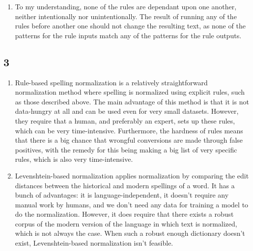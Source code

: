 \documentclass{article}
\begin{document}
\begin{enumerate}
\begin{enumerate}
        \item ``-ie'' is replaced by ``-y'' at the end of a word. This is seemingly a historical spelling in words such as ``Normandie'', which is nowadays spelled ``Normandy'', alongside varying other words.
    \end{enumerate}
    \item To my understanding, none of the rules are dependant upon one another, neither intentionally nor unintentionally. The result of running any of the rules before another one should not change the resulting text, as none of the patterns for the rule inputs match any of the patterns for the rule outputs.
\end{enumerate}

\subsection{3}
\begin{enumerate}
    \item Rule-based spelling normalization is a relatively straightforward normalization method where spelling is normalized using explicit rules, such as those described above. The main advantage of this method is that it is not data-hungry at all and can be used even for very small datasets. However, they require that a human, and preferably an expert, sets up these rules, which can be very time-intensive. Furthermore, the hardness of rules means that there is a big chance that wrongful conversions are made through false positives, with the remedy for this being making a big list of very specific rules, which is also very time-intensive.
    \item Levenshtein-based normalization applies normalization by comparing the edit distances between the historical and modern spellings of a word. It has a bunch of advantages: it is language-independent, it doesn't require any manual work by humans, and we don't need any data for training a model to do the normalization. However, it does require that there exists a robust corpus of the modern version of the language in which text is normalized, which is not always the case. When such a robust enough dictionary doesn't exist, Levenshtein-based normalization isn't feasible.
\end{enumerate}
\end{document}
